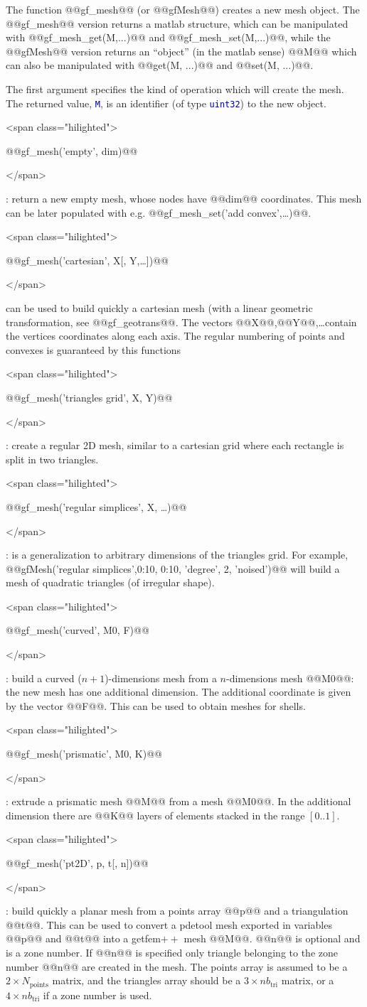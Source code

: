 \documentclass[11pt,a4paper]{article}
\newcommand{\text}[1]{\mathrm{#1}}
\newcommand{\sf}[1]{#1}
\newcommand{\kw}[1]{\textcolor{darkblue}{\texttt{#1}}}
\newcommand{\hil}[1]{\begin{rawxml}<span class="hilighted">\end{rawxml}#1\begin{rawxml}</span>\end{rawxml}}
\newcommand{\sep}[1]{\medskip\par\hil{#1}}
\newcommand{\kw}[1]{\textcolor{darkblue}{\texttt{#1}}}
\newcommand{\hil}[1]{\colorbox{sepbg}{#1}}
\newcommand{\sep}[1]{\medskip\par#1}
\newcommand{\gf}{{\sf getfem${++}$}\xspace}
\begin{document}
\begin{cmddescription}
  The function @@gf\_mesh@@ (or @@gfMesh@@) creates a new mesh object.
  The @@gf\_mesh@@ version returns a matlab structure, which can be
  manipulated with @@gf\_mesh\_get(M,...)@@ and
  @@gf\_mesh\_set(M,...)@@, while the @@gfMesh@@ version returns an
  ``object'' (in the matlab sense) @@M@@ which can also be manipulated
  with @@get(M, ...)@@ and @@set(M, ...)@@.

  The first argument specifies the kind of operation which will create
  the mesh.  The returned value, \kw{M}, is an identifier (of type
  \kw{uint32}) to the new object.
  
  \sep{@@gf\_mesh('empty', dim)@@} : return a new empty mesh, whose nodes
  have @@dim@@ coordinates. This mesh can be later populated with
  e.g. @@gf\_mesh\_set('add convex',\ldots)@@.
  
  \sep{@@gf\_mesh('cartesian', X[, Y,\ldots])@@}  can be used to build quickly a cartesian
  mesh (with a linear geometric transformation, see @@gf\_geotrans@@. The
  vectors @@X@@,@@Y@@,\ldots contain the vertices coordinates along each axis. The
  regular numbering of points and convexes is guaranteed by this functions
  
  \sep{@@gf\_mesh('triangles grid', X, Y)@@} :  create a regular
  2D mesh, similar to a cartesian grid where each rectangle is split
  in two triangles.

  \sep{@@gf\_mesh('regular simplices', X, \ldots)@@} : is a generalization to
  arbitrary dimensions of the triangles grid. For example,
  @@gfMesh('regular simplices',0:10, 0:10, 'degree', 2, 'noised')@@
  will build a mesh of quadratic triangles (of irregular shape).
  
  \sep{@@gf\_mesh('curved', M0, F)@@} :  build a curved
  ($n+1$)-dimensions mesh from a $n$-dimensions mesh @@M0@@: the
  new mesh has one additional dimension. The additional coordinate is
  given by the vector @@F@@. This can be used to obtain meshes for shells.


  \sep{@@gf\_mesh('prismatic', M0, K)@@} :  
  extrude a prismatic mesh @@M@@ from a mesh @@M0@@. In the additional dimension
  there are @@K@@ layers of elements stacked in the range $[0..1]$.
  
  \sep{@@gf\_mesh('pt2D', p, t[, n])@@} : build quickly a planar mesh from a points
  array @@p@@ and a triangulation @@t@@. This can be used to convert a pdetool
  mesh exported in variables @@p@@ and @@t@@ into a \gf mesh @@M@@.  @@n@@ is
  optional and is a zone number. If @@n@@ is specified only triangle belonging
  to the zone number @@n@@ are created in the mesh. The points array \kw@@p@@ is
  assumed to be a $2\times N_{\text{points}}$ matrix, and the triangles array should
  be a $3\times nb_{\text{tri}}$ matrix, or a $4\times nb_{\text{tri}}$ if a zone number
  is used.
  

\end{cmddescription}
\end{document}
